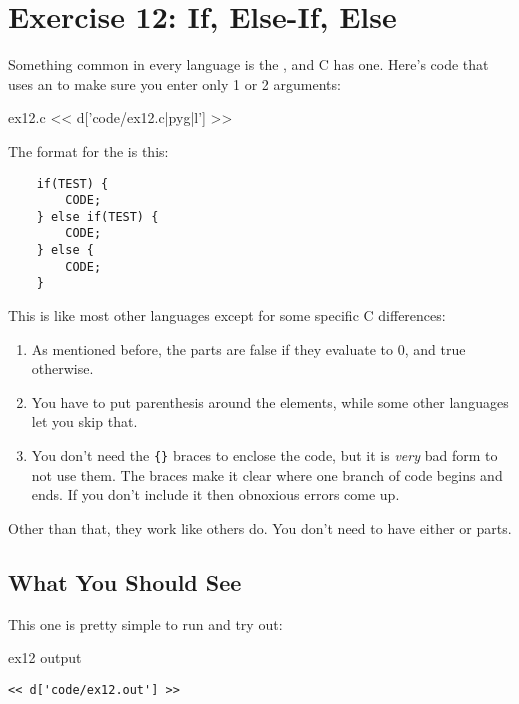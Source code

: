 \chapter{Exercise 12: If, Else-If, Else}

Something common in every language is the , and
C has one.  Here's code that uses an  to make 
sure you enter only 1 or 2 arguments:

\begin{code}{ex12.c}
<< d['code/ex12.c|pyg|l'] >>
\end{code}

The format for the  is this:

\begin{Verbatim}
    if(TEST) {
        CODE;
    } else if(TEST) {
        CODE;
    } else {
        CODE;
    }
\end{Verbatim}

This is like most other languages except for some specific C 
differences:

\begin{enumerate}
\item As mentioned before, the  parts are false if they
    evaluate to 0, and true otherwise.
\item You have to put parenthesis around the  elements,
    while some other languages let you skip that.
\item You don't need the \verb|{}| braces to enclose the code, but
    it is \emph{very} bad form to not use them.  The braces make it
    clear where one branch of code begins and ends.  If you don't 
    include it then obnoxious errors come up.
\end{enumerate}

Other than that, they work like others do.  You don't need to have
either  or  parts.

\section{What You Should See}

This one is pretty simple to run and try out:

\begin{code}{ex12 output}
\begin{lstlisting}
<< d['code/ex12.out'] >>
\end{lstlisting}
\end{code}

